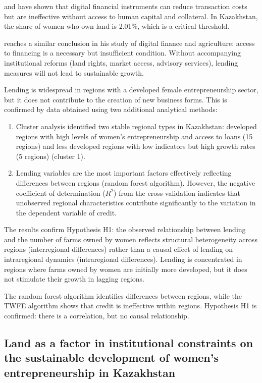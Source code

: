 \documentclass[pdflatex,sn-mathphys-ay]{sn-jnl}
\begin{document}
\citet{ref18} and \citet{ref56} have shown that digital
financial instruments can reduce transaction costs but are ineffective
without access to human capital and collateral. In Kazakhstan, the share
of women who own land is 2.01\%, which is a critical threshold.

\citet{ref43} reaches a similar conclusion in his study of
digital finance and agriculture: access to financing is a necessary but
insufficient condition. Without accompanying institutional reforms (land
rights, market access, advisory services), lending measures will not
lead to sustainable growth.

Lending is widespread in regions with a developed female
entrepreneurship sector, but it does not contribute to the creation of
new business forms. This is confirmed by data obtained using two
additional analytical methods:

\begin{enumerate}
\item Cluster analysis identified two stable regional types in
Kazakhstan: developed regions with high levels of women's
entrepreneurship and access to loans (15 regions) and less developed
regions with low indicators but high growth rates (5 regions)
(cluster 1).

\item Lending variables are the most important factors effectively
reflecting differences between regions (random forest algorithm).
However, the negative coefficient of determination ($R^2$) from the
cross-validation indicates that unobserved regional characteristics
contribute significantly to the variation in the dependent variable of
credit.
\end{enumerate}

The results confirm Hypothesis H1: the observed relationship between
lending and the number of farms owned by women reflects structural
heterogeneity across regions (interregional differences) rather than a
causal effect of lending on intraregional dynamics (intraregional
differences). Lending is concentrated in regions where farms owned by
women are initially more developed, but it does not stimulate their
growth in lagging regions.

The random forest algorithm identifies differences between regions,
while the TWFE algorithm shows that credit is ineffective within
regions. Hypothesis H1 is confirmed: there is a correlation, but no
causal relationship.

\subsection{Land as a factor in institutional constraints on the sustainable development of women's entrepreneurship in Kazakhstan}
\end{document}
